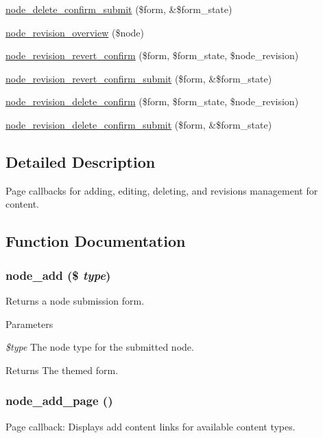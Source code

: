 \begin{DoxyCompactItemize}
\item 
\hyperlink{node_8pages_8inc_a2d744b2bdca2ec49b8eaa0fc7c69e1c3}{node\_\-delete\_\-confirm\_\-submit} (\$form, \&\$form\_\-state)
\item 
\hyperlink{node_8pages_8inc_a1654ae495e6814b2f08c7a8e4aeabd68}{node\_\-revision\_\-overview} (\$node)
\item 
\hyperlink{group__forms_ga755acf87a0cd1c4d9d457843656c397b}{node\_\-revision\_\-revert\_\-confirm} (\$form, \$form\_\-state, \$node\_\-revision)
\item 
\hyperlink{node_8pages_8inc_ae22f280976210711cb3bd363caa6d956}{node\_\-revision\_\-revert\_\-confirm\_\-submit} (\$form, \&\$form\_\-state)
\item 
\hyperlink{group__forms_gae46b8603fe31b65546854c92d5923b68}{node\_\-revision\_\-delete\_\-confirm} (\$form, \$form\_\-state, \$node\_\-revision)
\item 
\hyperlink{node_8pages_8inc_ad6e0dfda7fccc07dfd93dd257e8ed99f}{node\_\-revision\_\-delete\_\-confirm\_\-submit} (\$form, \&\$form\_\-state)
\end{DoxyCompactItemize}


\subsection{Detailed Description}
Page callbacks for adding, editing, deleting, and revisions management for content. 

\subsection{Function Documentation}
\hypertarget{node_8pages_8inc_a29be8dfd0fadad9f4399d50ab3615461}{
\subsubsection[{node\_\-add}]{\setlength{\rightskip}{0pt plus 5cm}node\_\-add (\$ {\em type})}}
\label{node_8pages_8inc_a29be8dfd0fadad9f4399d50ab3615461}
Returns a node submission form.


\begin{DoxyParams}{Parameters}
\item[{\em \$type}]The node type for the submitted node.\end{DoxyParams}
\begin{DoxyReturn}{Returns}
The themed form. 
\end{DoxyReturn}
\hypertarget{node_8pages_8inc_ac51e34d673a1de68491ea88ea30832b9}{
\subsubsection[{node\_\-add\_\-page}]{\setlength{\rightskip}{0pt plus 5cm}node\_\-add\_\-page ()}}
\label{node_8pages_8inc_ac51e34d673a1de68491ea88ea30832b9}
Page callback: Displays add content links for available content types.

